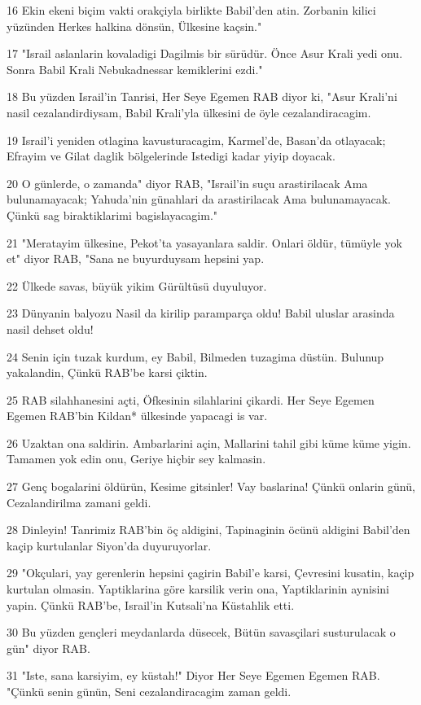 \par 16 Ekin ekeni biçim vakti orakçiyla birlikte Babil'den atin. Zorbanin kilici yüzünden Herkes halkina dönsün, Ülkesine kaçsin."
\par 17 "Israil aslanlarin kovaladigi Dagilmis bir sürüdür. Önce Asur Krali yedi onu. Sonra Babil Krali Nebukadnessar kemiklerini ezdi."
\par 18 Bu yüzden Israil'in Tanrisi, Her Seye Egemen RAB diyor ki, "Asur Krali'ni nasil cezalandirdiysam, Babil Krali'yla ülkesini de öyle cezalandiracagim.
\par 19 Israil'i yeniden otlagina kavusturacagim, Karmel'de, Basan'da otlayacak; Efrayim ve Gilat daglik bölgelerinde Istedigi kadar yiyip doyacak.
\par 20 O günlerde, o zamanda" diyor RAB, "Israil'in suçu arastirilacak Ama bulunamayacak; Yahuda'nin günahlari da arastirilacak Ama bulunamayacak. Çünkü sag biraktiklarimi bagislayacagim."
\par 21 "Meratayim ülkesine, Pekot'ta yasayanlara saldir. Onlari öldür, tümüyle yok et" diyor RAB, "Sana ne buyurduysam hepsini yap.
\par 22 Ülkede savas, büyük yikim Gürültüsü duyuluyor.
\par 23 Dünyanin balyozu Nasil da kirilip paramparça oldu! Babil uluslar arasinda nasil dehset oldu!
\par 24 Senin için tuzak kurdum, ey Babil, Bilmeden tuzagima düstün. Bulunup yakalandin, Çünkü RAB'be karsi çiktin.
\par 25 RAB silahhanesini açti, Öfkesinin silahlarini çikardi. Her Seye Egemen Egemen RAB'bin Kildan* ülkesinde yapacagi is var.
\par 26 Uzaktan ona saldirin. Ambarlarini açin, Mallarini tahil gibi küme küme yigin. Tamamen yok edin onu, Geriye hiçbir sey kalmasin.
\par 27 Genç bogalarini öldürün, Kesime gitsinler! Vay baslarina! Çünkü onlarin günü, Cezalandirilma zamani geldi.
\par 28 Dinleyin! Tanrimiz RAB'bin öç aldigini, Tapinaginin öcünü aldigini Babil'den kaçip kurtulanlar Siyon'da duyuruyorlar.
\par 29 "Okçulari, yay gerenlerin hepsini çagirin Babil'e karsi, Çevresini kusatin, kaçip kurtulan olmasin. Yaptiklarina göre karsilik verin ona, Yaptiklarinin aynisini yapin. Çünkü RAB'be, Israil'in Kutsali'na Küstahlik etti.
\par 30 Bu yüzden gençleri meydanlarda düsecek, Bütün savasçilari susturulacak o gün" diyor RAB.
\par 31 "Iste, sana karsiyim, ey küstah!" Diyor Her Seye Egemen Egemen RAB. "Çünkü senin günün, Seni cezalandiracagim zaman geldi.
